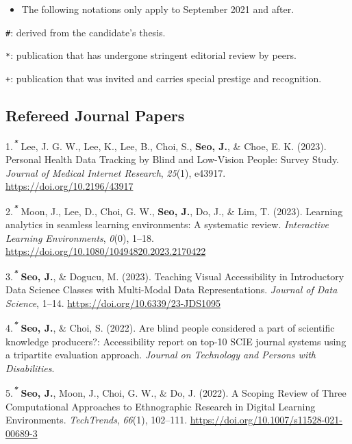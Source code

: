 \documentclass[11pt,a4paper,]{awesome-cv}
\providecommand{\tightlist}{%
	\setlength{\itemsep}{0pt}\setlength{\parskip}{0pt}}
\begin{document}
\begin{itemize}
\tightlist
\item
  The following notations only apply to September 2021 and after.
\end{itemize}

\texttt{\#}: derived from the candidate's thesis.

\texttt{*}: publication that has undergone stringent editorial review by
peers.

\texttt{+}: publication that was invited and carries special prestige
and recognition.

\hypertarget{refereed-journal-papers}{%
\subsection{Refereed Journal Papers}\label{refereed-journal-papers}}

\hypertarget{bibliography}{}
\leavevmode{}%
1.\textsuperscript{\textbf{\emph{*}}} Lee, J. G. W., Lee, K., Lee, B.,
Choi, S., \textbf{Seo, J.}, \& Choe, E. K. (2023). Personal Health Data
Tracking by Blind and Low-Vision People: Survey Study. \emph{Journal of
Medical Internet Research}, \emph{25}(1), e43917.
\url{https://doi.org/10.2196/43917}

\leavevmode{}%
2.\textsuperscript{\textbf{\emph{*}}} Moon, J., Lee, D., Choi, G. W.,
\textbf{Seo, J.}, Do, J., \& Lim, T. (2023). Learning analytics in
seamless learning environments: A systematic review. \emph{Interactive
Learning Environments}, \emph{0}(0), 1--18.
\url{https://doi.org/10.1080/10494820.2023.2170422}

\leavevmode{}%
3.\textsuperscript{\textbf{\emph{*}}} \textbf{Seo, J.}, \& Dogucu, M.
(2023). Teaching Visual Accessibility in Introductory Data Science
Classes with Multi-Modal Data Representations. \emph{Journal of Data
Science}, 1--14. \url{https://doi.org/10.6339/23-JDS1095}

\leavevmode{}%
4.\textsuperscript{\textbf{\emph{*}}} \textbf{Seo, J.}, \& Choi, S.
(2022). Are blind people considered a part of scientific knowledge
producers?: Accessibility report on top-10 SCIE journal systems using a
tripartite evaluation approach. \emph{Journal on Technology and Persons
with Disabilities}.

\leavevmode{}%
5.\textsuperscript{\textbf{\emph{*}}} \textbf{Seo, J.}, Moon, J., Choi,
G. W., \& Do, J. (2022). A Scoping Review of Three Computational
Approaches to Ethnographic Research in Digital Learning Environments.
\emph{TechTrends}, \emph{66}(1), 102--111.
\url{https://doi.org/10.1007/s11528-021-00689-3}
\end{document}
